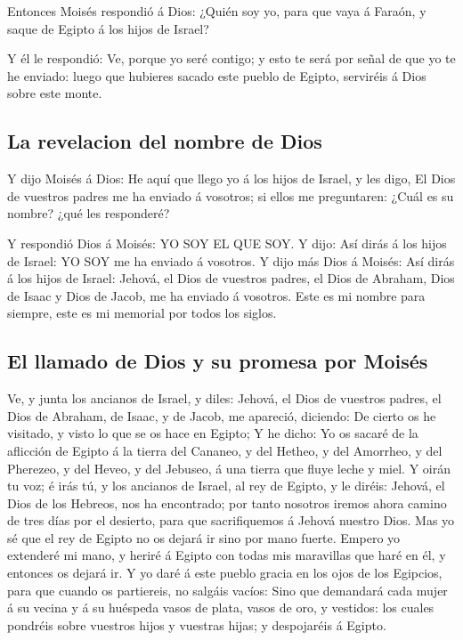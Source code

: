  Entonces Moisés respondió á Dios: ¿Quién soy yo, para que
vaya á Faraón, y saque de Egipto á los hijos de Israel?

 Y él le respondió: Ve, porque yo seré contigo; y esto te
será por señal de que yo te he enviado: luego que hubieres sacado este
pueblo de Egipto, serviréis á Dios sobre este monte.

\hypertarget{la-revelacion-del-nombre-de-dios}{%
\subsection{La revelacion del nombre de
Dios}\label{la-revelacion-del-nombre-de-dios}}

 Y dijo Moisés á Dios: He aquí que llego yo á los hijos de
Israel, y les digo, El Dios de vuestros padres me ha enviado á vosotros;
si ellos me preguntaren: ¿Cuál es su nombre? ¿qué les responderé?

 Y respondió Dios á Moisés: YO SOY EL QUE SOY. Y dijo: Así
dirás á los hijos de Israel: YO SOY me ha enviado á vosotros.
 Y dijo más Dios á Moisés: Así dirás á los hijos de Israel:
Jehová, el Dios de vuestros padres, el Dios de Abraham, Dios de Isaac y
Dios de Jacob, me ha enviado á vosotros. Este es mi nombre para siempre,
este es mi memorial por todos los siglos.

\hypertarget{el-llamado-de-dios-y-su-promesa-por-moisuxe9s}{%
\subsection{El llamado de Dios y su promesa por
Moisés}\label{el-llamado-de-dios-y-su-promesa-por-moisuxe9s}}

 Ve, y junta los ancianos de Israel, y diles: Jehová, el
Dios de vuestros padres, el Dios de Abraham, de Isaac, y de Jacob, me
apareció, diciendo: De cierto os he visitado, y visto lo que se os hace
en Egipto;  Y he dicho: Yo os sacaré de la aflicción de
Egipto á la tierra del Cananeo, y del Hetheo, y del Amorrheo, y del
Pherezeo, y del Heveo, y del Jebuseo, á una tierra que fluye leche y
miel.  Y oirán tu voz; é irás tú, y los ancianos de Israel,
al rey de Egipto, y le diréis: Jehová, el Dios de los Hebreos, nos ha
encontrado; por tanto nosotros iremos ahora camino de tres días por el
desierto, para que sacrifiquemos á Jehová nuestro Dios. 
Mas yo sé que el rey de Egipto no os dejará ir sino por mano fuerte.
 Empero yo extenderé mi mano, y heriré á Egipto con todas
mis maravillas que haré en él, y entonces os dejará ir.  Y
yo daré á este pueblo gracia en los ojos de los Egipcios, para que
cuando os partiereis, no salgáis vacíos:  Sino que
demandará cada mujer á su vecina y á su huéspeda vasos de plata, vasos
de oro, y vestidos: los cuales pondréis sobre vuestros hijos y vuestras
hijas; y despojaréis á Egipto.

